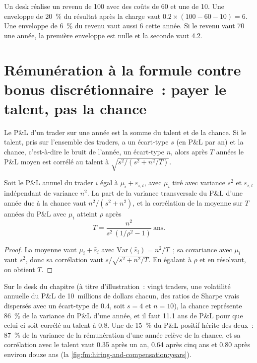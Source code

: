 \begin{example}\label{ex:fm:hiring-and-compensation:pools}
Un desk réalise un revenu de 100 avec des coûts de 60 et une  de 10. Une enveloppe de 20~\% du résultat après la charge vaut $0.2\times(100-60-10)=6$. Une
enveloppe de 6~\% du revenu vaut aussi 6 cette année. Si le revenu vaut 70 une année, la première enveloppe est nulle et la seconde vaut 4.2.
\end{example}

\section{Rémunération à la formule contre bonus discrétionnaire~: payer le talent, pas la chance}

Le P\&L d'un trader sur une année est la somme du talent et de la chance. Si le talent, pris sur l'ensemble des traders, a un écart-type $s$ (en P\&L par an) et la chance, c'est-à-dire le bruit de l'année, un
écart-type $n$, alors après $T$ années le P\&L moyen est corrélé au talent à $\sqrt{s^2/(s^2+n^2/T)}$.

\begin{proposition}\label{prop:fm:hiring-and-compensation:years}
Soit le P\&L annuel du trader $i$ égal à $\mu_i+\varepsilon_{i,t}$, avec $\mu_i$ tiré avec variance $s^2$ et $\varepsilon_{i,t}$ indépendant de
variance $n^2$. La part de la variance transversale du P\&L d'une année due à la chance vaut $n^2/(s^2+n^2)$, et la corrélation de la moyenne sur $T$ années
du P\&L avec $\mu_i$ atteint $\rho$ après
\[
T=\frac{n^2}{s^2\,(1/\rho^2-1)}\ \text{ans}.
\]
\end{proposition}

\begin{proof}
La moyenne vaut $\mu_i+\bar\varepsilon_i$ avec $\mathrm{Var}(\bar\varepsilon_i)=n^2/T$~; sa covariance avec $\mu_i$ vaut $s^2$, donc sa corrélation
vaut $s/\sqrt{s^2+n^2/T}$. En égalant à $\rho$ et en résolvant, on obtient $T$.
\end{proof}

Sur le desk du chapitre (à titre d'illustration~: vingt traders, une volatilité annuelle du P\&L de 10~millions de dollars chacun, des ratios de Sharpe vrais dispersés avec un écart-type
de 0.4, soit $s=4$ et $n=10$), la chance représente 86~\% de la variance du P\&L d'une année, et il faut 11.1 ans de P\&L pour que celui-ci soit corrélé au talent à 0.8.
Une  de 15~\% du P\&L positif hérite des deux~: 87~\% de la variance de la rémunération d'une année relève de la chance, et sa corrélation avec le talent vaut 0.35 après
un an, 0.64 après cinq ans et 0.80 après environ douze ans (la \cref{fig:fm:hiring-and-compensation:years}).

